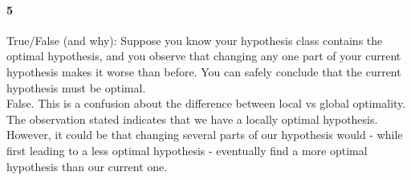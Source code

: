 \documentclass[11pt]{article}
\begin{document}
\paragraph{5} True/False (and why): Suppose you know your hypothesis class contains the
optimal hypothesis, and you observe that changing any one part of your current hypothesis makes it
worse than before. You can safely conclude that the current hypothesis must be optimal.\\

False. This is a confusion about the difference between local vs global optimality. The observation
stated indicates that we have a locally optimal hypothesis. However, it could be that changing
several parts of our hypothesis would - while first leading to a less optimal hypothesis - eventually
find a more optimal hypothesis than our current one.
\end{document}
